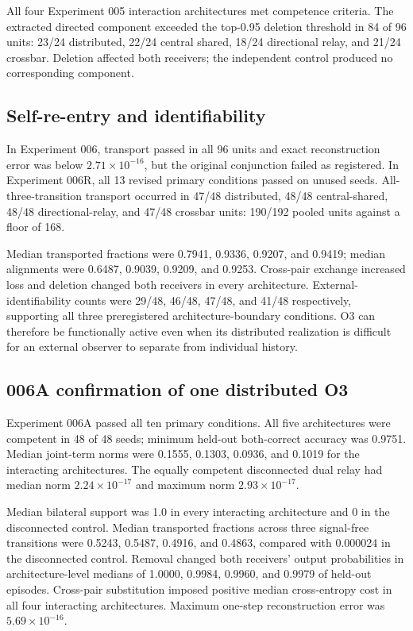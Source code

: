 \documentclass[11pt,a4paper]{article}
\begin{document}
All four Experiment 005 interaction architectures met competence criteria. The extracted directed component exceeded the top-0.95 deletion threshold in 84 of 96 units: 23/24 distributed, 22/24 central shared, 18/24 directional relay, and 21/24 crossbar. Deletion affected both receivers; the independent control produced no corresponding component.

\subsection{Self-re-entry and identifiability}

In Experiment 006, transport passed in all 96 units and exact reconstruction error was below $2.71\times10^{-16}$, but the original conjunction failed as registered. In Experiment 006R, all 13 revised primary conditions passed on unused seeds. All-three-transition transport occurred in 47/48 distributed, 48/48 central-shared, 48/48 directional-relay, and 47/48 crossbar units: 190/192 pooled units against a floor of 168.

Median transported fractions were 0.7941, 0.9336, 0.9207, and 0.9419; median alignments were 0.6487, 0.9039, 0.9209, and 0.9253. Cross-pair exchange increased loss and deletion changed both receivers in every architecture. External-identifiability counts were 29/48, 46/48, 47/48, and 41/48 respectively, supporting all three preregistered architecture-boundary conditions. O3 can therefore be functionally active even when its distributed realization is difficult for an external observer to separate from individual history.

\subsection{006A confirmation of one distributed O3}

Experiment 006A passed all ten primary conditions. All five architectures were competent in 48 of 48 seeds; minimum held-out both-correct accuracy was 0.9751. Median joint-term norms were 0.1555, 0.1303, 0.0936, and 0.1019 for the interacting architectures. The equally competent disconnected dual relay had median norm $2.24\times10^{-17}$ and maximum norm $2.93\times10^{-17}$.

Median bilateral support was 1.0 in every interacting architecture and 0 in the disconnected control. Median transported fractions across three signal-free transitions were 0.5243, 0.5487, 0.4916, and 0.4863, compared with 0.000024 in the disconnected control. Removal changed both receivers' output probabilities in architecture-level medians of 1.0000, 0.9984, 0.9960, and 0.9979 of held-out episodes. Cross-pair substitution imposed positive median cross-entropy cost in all four interacting architectures. Maximum one-step reconstruction error was $5.69\times10^{-16}$.
\end{document}
